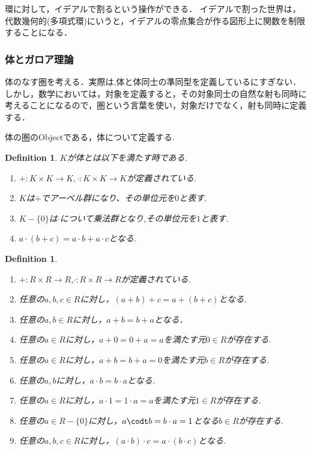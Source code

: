 \documentclass{ujarticle}
\newtheorem{dfn}[thm]{Definition}
\begin{document}
環に対して，イデアルで割るという操作ができる．
イデアルで割った世界は，代数幾何的(多項式環)にいうと，イデアルの零点集合が作る図形上に関数を制限することになる．


\subsubsection{体とガロア理論}
\label{subs:体とガロア理論}

体のなす圏を考える．実際は,体と体同士の準同型を定義しているにすぎない．しかし，数学においては，対象を定義すると，その対象同士の自然な射も同時に考えることになるので，圏という言葉を使い，対象だけでなく，射も同時に定義する．

体の圏のObjectである，体について定義する.
\begin{dfn}
$K$が体とは以下を満たす時である.
\begin{enumerate}
  \setlength{\parskip}{0cm} %
  \setlength{\itemsep}{0cm} %
  \item $ + :K \times K \to K, \cdot : K \times K \to K$が定義されている.
  \item $K$は$+$でアーベル群になり、その単位元を$0$と表す.
  \item $K - \{ 0 \}$は$  \cdot   $について乗法群となり,その単位元を$1$と表す.
  \item $a \cdot (b + c) = a \cdot b + a \cdot c $となる.
\end{enumerate}
\end{dfn}

\begin{dfn}
  \begin{enumerate}
    \setlength{\parskip}{0cm} %
    \setlength{\itemsep}{0cm} %
    \item $+:R \times R \to R$,$\cdot:R \times R \to R $が定義されている.
    \item 任意の$a,b,c \in R$に対し，$(a + b) +c =a +(b +c)$となる.
    \item 任意の$a,b \in R$に対し，$a + b = b + a$となる．
    \item 任意の$a \in R$に対し，$a + 0 =  0 + a = a$を満たす元$0 \in R$が存在する.
    \item 任意の$a \in R$に対し，$a + b = b + a =0$を満たす元$b \in R $が存在する.
    \item 任意の$a,b$に対し，$a \cdot b = b \cdot a$となる.
    \item 任意の$a \in R$に対し，$a \cdot 1 = 1 \cdot a =a$を満たす元$1 \in R$が存在する.
    \item 任意の$a \in R-\{0\}$に対し，$a \codt b = b \cdot a = 1$となる$b \in R$が存在する.
    \item 任意の$a,b,c \in R$に対し，$(a \cdot b) \cdot c =a \cdot (b \cdot c)$となる.
  \end{enumerate}
\end{dfn}
\end{document}
